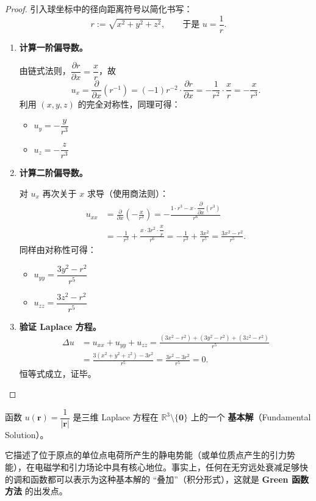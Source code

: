\documentclass[lang=cn,11pt]{elegantbook}
\begin{document}
\begin{proof}
引入球坐标中的径向距离符号以简化书写：
\[
r:=\sqrt{x^2+y^2+z^2},\qquad\text{于是 }u=\frac{1}{r}.
\]

\begin{enumerate}
  \item \textbf{计算一阶偏导数。}
  
  由链式法则，$\dfrac{\partial r}{\partial x}=\dfrac{x}{r}$，故
  \[
  u_x=\frac{\partial}{\partial x}\!\left(r^{-1}\right)
  =(-1)r^{-2}\cdot\frac{\partial r}{\partial x}
  =-\frac{1}{r^2}\cdot\frac{x}{r}
  =-\frac{x}{r^3}.
  \]
  利用 $(x,y,z)$ 的完全对称性，同理可得：
  \begin{itemize}
      \item $u_y=-\dfrac{y}{r^3}$
      \item $u_z=-\dfrac{z}{r^3}$
  \end{itemize}

  \item \textbf{计算二阶偏导数。}
  
  对 $u_x$ 再次关于 $x$ 求导（使用商法则）：
  \begin{align*}
  u_{xx}&=\frac{\partial}{\partial x}\!\left(-\frac{x}{r^3}\right)
  =-\frac{1\cdot r^3-x\cdot\dfrac{\partial}{\partial x}(r^3)}{r^6}\\[6pt]
  &=-\frac{1}{r^3}+\frac{x\cdot 3r^2\cdot\dfrac{x}{r}}{r^6}
  =-\frac{1}{r^3}+\frac{3x^2}{r^5}
  =\frac{3x^2-r^2}{r^5}.
  \end{align*}
  同样由对称性可得：
  \begin{itemize}
      \item $u_{yy}=\dfrac{3y^2-r^2}{r^5}$
      \item $u_{zz}=\dfrac{3z^2-r^2}{r^5}$
  \end{itemize}

  \item \textbf{验证 Laplace 方程。}
  \begin{align*}
  \Delta u&=u_{xx}+u_{yy}+u_{zz}
  =\frac{(3x^2-r^2)+(3y^2-r^2)+(3z^2-r^2)}{r^5}\\[4pt]
  &=\frac{3(x^2+y^2+z^2)-3r^2}{r^5}
  =\frac{3r^2-3r^2}{r^5}=0.
  \end{align*}
  恒等式成立，证毕。
\end{enumerate}
\end{proof}

\begin{note}[物理意义]
函数 $u(\boldsymbol r)=\dfrac{1}{|\boldsymbol r|}$ 是三维 Laplace 方程在 $\mathbb R^3\setminus\{\boldsymbol 0\}$ 上的一个 \textbf{基本解}（Fundamental Solution）。

它描述了位于原点的单位点电荷所产生的静电势能（或单位质点产生的引力势能），在电磁学和引力场论中具有核心地位。事实上，任何在无穷远处衰减足够快的调和函数都可以表示为这种基本解的 ``叠加''（积分形式），这就是 \textbf{Green 函数方法} 的出发点。
\end{note}
\end{document}
